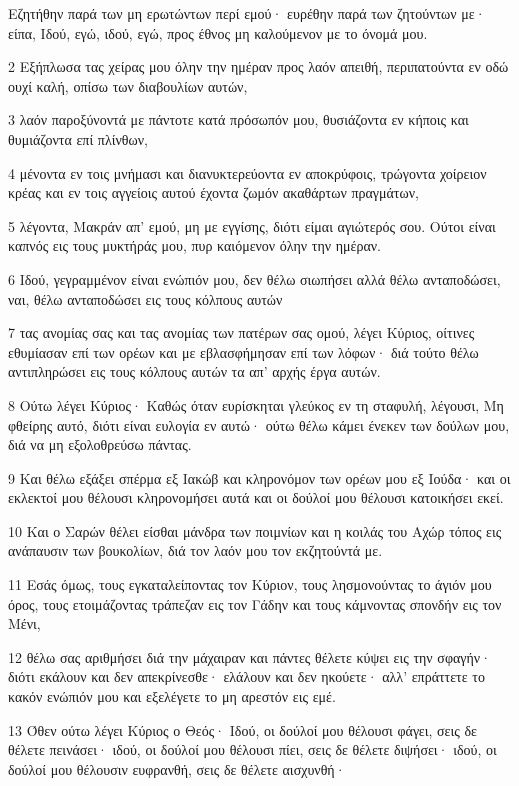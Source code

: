 \par Εζητήθην παρά των μη ερωτώντων περί εμού· ευρέθην παρά των ζητούντων με· είπα, Ιδού, εγώ, ιδού, εγώ, προς έθνος μη καλούμενον με το όνομά μου.
\par 2 Εξήπλωσα τας χείρας μου όλην την ημέραν προς λαόν απειθή, περιπατούντα εν οδώ ουχί καλή, οπίσω των διαβουλίων αυτών,
\par 3 λαόν παροξύνοντά με πάντοτε κατά πρόσωπόν μου, θυσιάζοντα εν κήποις και θυμιάζοντα επί πλίνθων,
\par 4 μένοντα εν τοις μνήμασι και διανυκτερεύοντα εν αποκρύφοις, τρώγοντα χοίρειον κρέας και εν τοις αγγείοις αυτού έχοντα ζωμόν ακαθάρτων πραγμάτων,
\par 5 λέγοντα, Μακράν απ' εμού, μη με εγγίσης, διότι είμαι αγιώτερός σου. Ούτοι είναι καπνός εις τους μυκτήράς μου, πυρ καιόμενον όλην την ημέραν.
\par 6 Ιδού, γεγραμμένον είναι ενώπιόν μου, δεν θέλω σιωπήσει αλλά θέλω ανταποδώσει, ναι, θέλω ανταποδώσει εις τους κόλπους αυτών
\par 7 τας ανομίας σας και τας ανομίας των πατέρων σας ομού, λέγει Κύριος, οίτινες εθυμίασαν επί των ορέων και με εβλασφήμησαν επί των λόφων· διά τούτο θέλω αντιπληρώσει εις τους κόλπους αυτών τα απ' αρχής έργα αυτών.
\par 8 Ούτω λέγει Κύριος· Καθώς όταν ευρίσκηται γλεύκος εν τη σταφυλή, λέγουσι, Μη φθείρης αυτό, διότι είναι ευλογία εν αυτώ· ούτω θέλω κάμει ένεκεν των δούλων μου, διά να μη εξολοθρεύσω πάντας.
\par 9 Και θέλω εξάξει σπέρμα εξ Ιακώβ και κληρονόμον των ορέων μου εξ Ιούδα· και οι εκλεκτοί μου θέλουσι κληρονομήσει αυτά και οι δούλοί μου θέλουσι κατοικήσει εκεί.
\par 10 Και ο Σαρών θέλει είσθαι μάνδρα των ποιμνίων και η κοιλάς του Αχώρ τόπος εις ανάπαυσιν των βουκολίων, διά τον λαόν μου τον εκζητούντά με.
\par 11 Εσάς όμως, τους εγκαταλείποντας τον Κύριον, τους λησμονούντας το άγιόν μου όρος, τους ετοιμάζοντας τράπεζαν εις τον Γάδην και τους κάμνοντας σπονδήν εις τον Μένι,
\par 12 θέλω σας αριθμήσει διά την μάχαιραν και πάντες θέλετε κύψει εις την σφαγήν· διότι εκάλουν και δεν απεκρίνεσθε· ελάλουν και δεν ηκούετε· αλλ' επράττετε το κακόν ενώπιόν μου και εξελέγετε το μη αρεστόν εις εμέ.
\par 13 Όθεν ούτω λέγει Κύριος ο Θεός· Ιδού, οι δούλοί μου θέλουσι φάγει, σεις δε θέλετε πεινάσει· ιδού, οι δούλοί μου θέλουσι πίει, σεις δε θέλετε διψήσει· ιδού, οι δούλοί μου θέλουσιν ευφρανθή, σεις δε θέλετε αισχυνθή·
